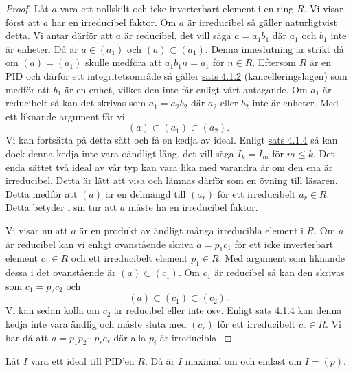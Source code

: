 \documentclass{article}
\theoremstyle{definition}
\begin{document}
\begin{proof}
  Låt $a$ vara ett nollskilt och icke inverterbart element i en ring $R$. Vi visar först att $a$ har en irreducibel faktor. 
  Om $a$ är irreducibel så gäller naturligtvist detta. Vi antar därför att $a$ är reducibel, det vill säga $a = a_1b_1$
  där $a_1$ och $b_1$ inte är enheter. Då är $a \in (a_1)$ och $(a) \subset (a_1)$. Denna inneslutning är strikt då 
  om $(a) = (a_1)$ skulle medföra att $a_1b_1n = a_1$ för $n \in R$. Eftersom $R$ är en PID och därför ett integritetsområde
  så gäller \hyperlink{kancelleringslagen}{sats 4.1.2} (kancelleringslagen) 
  som medför att $b_1$ är en enhet, vilket den inte får enligt vårt antagande. 
  Om $a_1$ är reducibelt så kan det skrivas som $a_1 = a_2b_2$ där $a_2$ eller $b_2$ inte är enheter. Med ett liknande argument får vi 
  \[(a) \subset (a_1) \subset (a_2).\]
  Vi kan fortsätta på detta sätt och få en kedja av ideal. Enligt \hyperlink{pidnoe}{sats 4.1.4} så kan dock denna kedja inte vara oändligt lång, 
  det vill säga $I_k = I_m$ för $m \leq k$. Det enda sättet två ideal av vår typ kan vara lika med varandra är om den ena är irreducibel. Detta är 
  lätt att visa och lämnas därför som en övning till läsaren. Detta medför att $(a)$ är en delmängd till $(a_r)$ för ett irreducibelt $a_r \in R$. 
  Detta betyder i sin tur att $a$ måste ha en irreducibel faktor.
  
  Vi visar nu att $a$ är en produkt av ändligt många irreducibla element i $R$. Om $a$ är reducibel kan vi enligt ovanstående 
  skriva $a = p_1c_1$ för ett icke inverterbart element $c_1 \in R$ och ett irreducibelt element $p_1 \in R$. Med argument som 
  liknande dessa i det ovanstående är $(a) \subset (c_1)$. Om $c_1$ är reducibel så kan den skrivas som $c_1 = p_2c_2$ och 
  \[(a) \subset (c_1) \subset (c_2).\]
  Vi kan sedan kolla om $c_2$ är reducibel eller inte osv. Enligt \hyperlink{pidnoe}{sats 4.1.4} kan denna kedja inte vara ändlig och 
  måste sluta med $(c_r)$ för ett irreducibelt $c_r \in R$. Vi har då att $a = p_1p_2 \cdots p_rc_r$ där alla $p_i$ är irreducibla.
\end{proof}

\hypertarget{max}{}
\begin{mylemma}{}{}
  Låt $I$ vara ett ideal till PID'en $R$. Då är $I$ maximal om och endast om $I = (p).$
\end{mylemma}
\end{document}
